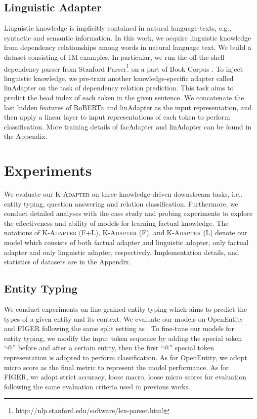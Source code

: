 \documentclass[11pt,a4paper]{article}
\begin{document}
\subsection{Linguistic Adapter}
Linguistic knowledge is implicitly contained in natural language texts, e.g., syntactic and semantic information. In this work, we acquire linguistic knowledge from dependency relationships among words in natural language text. 
We build a dataset consisting of 1M examples. In particular, we run the off-the-shell dependency parser from Stanford Parser\footnote{http://nlp.stanford.edu/software/lex-parser.html} on a part of Book Corpus \citep{Zhu2015bookcorpus}. 
To inject linguistic knowledge, we pre-train another knowledge-specific adapter called linAdapter on the task of dependency relation prediction. This task aims to predict the head index of each token in the given sentence. 
We concatenate the last hidden features of RoBERTa and linAdapter as the input representation, and then apply a linear layer to input representations of each token to perform classification. 
More training details of facAdapter and linAdapter can be found in the Appendix.







\section{Experiments}
We evaluate our \textsc{K-Adapter} on three knowledge-driven downstream tasks, i.e., entity typing, question answering and relation classification. Furthermore, we conduct detailed analyses with the case study and probing experiments to explore the effectiveness and ability of models for learning factual knowledge. The notations of \textsc{K-Adapter} (F+L), \textsc{K-Adapter} (F), and \textsc{K-Adapter} (L) denote our model which consists of both factual adapter and linguistic adapter, only factual adapter and only linguistic adapter, respectively. 
Implementation details, and statistics of datasets are in the Appendix. 


\subsection{Entity Typing}
We conduct experiments on fine-grained entity typing which aims to predict the types of a given entity and its context. We evaluate our models on OpenEntity \citep{choi2018openentity} and FIGER \citep{ling2015figer} following the same split setting as \citet{zhang2019ernie}. 
To fine-tune our models for entity typing, we modify the input token sequence by adding the special token ``@'' before and after a certain entity, then the first ``@'' special token representation is adopted to perform classification. 
As for OpenEntity, we adopt micro  score as the final metric to represent the model performance. As for FIGER, we adopt strict accuracy, loose macro, loose micro  scores \citep{lingW12} for evaluation following the same evaluation criteria used in previous works. 
\end{document}
